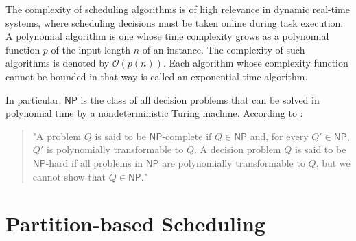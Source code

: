 \documentclass[conference]{IEEEtran}
\begin{document}

The complexity of scheduling algorithms is of high relevance in dynamic real-time systems, where scheduling decisions must be taken online during task execution. A polynomial algorithm is one whose time complexity grows as a polynomial function $p$ of the input length $n$ of an instance. The complexity of such algorithms is denoted by $\mathcal{O}(p(n))$. Each algorithm whose complexity function cannot be bounded in that way is called an exponential time algorithm.

In particular, $\mathsf{NP}$ is the class of all decision problems that can be solved in polynomial time by a nondeterministic Turing machine. According to \cite{butazo99}:

\begin{quote}
"A problem $Q$ is said to be $\mathsf{NP}$-complete if $Q \in \mathsf{NP}$ and, for every $Q' \in \mathsf{NP}$, $Q'$ is polynomially transformable to $Q$. A decision problem $Q$ is said to be $\mathsf{NP}$-hard if all problems in $\mathsf{NP}$ are polynomially transformable to $Q$, but we cannot show that $Q \in \mathsf{NP}$."
\end{quote}






\section{Partition-based Scheduling}
\label{sec: partition-based scheduling}
\end{document}
